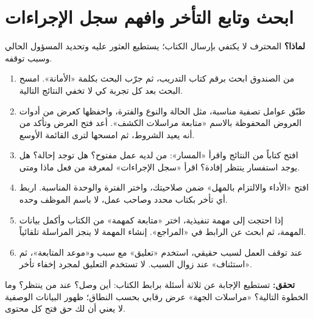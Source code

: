 \section{ابحث وتابع التأخر وافهم سجل الإجراءات}
\label{sec:followup}
\textbf{لماذا؟} المحترف لا يكتفي بإرسال الكتاب؛ يستطيع العثور عليه وتحديد المسؤول الحالي وسبب توقفه.
\begin{enumerate}
\item من الصندوق ابحث برقم كتاب التدريب، ثم جرّب البحث بكلمة «الأمانة». امسح البحث بعد كل تجربة كي لا تخفي النتائج التالية.
\item طبّق عوامل تصفية مناسبة، مثل الحالة والنوع والفترة، واحفظها كعرض من أدوات العروض المحفوظة بالاسم «متابعة مراسلات الكشف». أعد فتح العرض وتأكد من أنه يعيد الشروط، ثم امسحها لترى القائمة الأوسع.
\item افتح كتاباً من النتائج واقرأ «المسار»: من لديه عمل مفتوح؟ هل توجد إحالة؟ هل يوجد استفسار ينتظر إفادة؟ اقرأ «سجل الإجراءات» لمعرفة من فعل ماذا ومتى.
\item افتح «الأداء والالتزام بالمهل» ضمن صلاحيتك، واختر الفترة والوحدة المناسبة. اربط أي تأخر بكتاب محدد وصاحب عمل، لا باسم الموظف وحده.
\item إذا احتجت إلى مهمة تنفيذية، اختر «متابعة كمهمة» من الكتاب وأكمل بيانات المهمة، ثم ابحث عن الرابط في «المراجع». إنشاء المهمة لا ينجز المراسلة تلقائياً.
\item عند توقف العمل لسبب حقيقي، استخدم «تعليق» مع سبب و«موعد المتابعة»، ثم «استئناف» عند زوال السبب. لا تستخدم التعليق لمجرد إخفاء تأخر.
\end{enumerate}
\textbf{تحقق:} تستطيع الإجابة عن ثلاثة أسئلة برابط الكتاب: أين وصل؟ عند من ينتظر؟ وما الخطوة التالية؟ «مراسلات الجهة» عرض رقابي بحسب النطاق؛ ظهور البيانات الوصفية لا يعني أن لك حق فتح كل محتوى.

